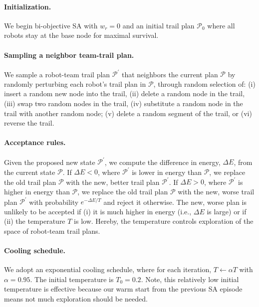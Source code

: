 \documentclass[fleqn,10pt,lineno]{wlpeerj}
\begin{document}
\paragraph{Initialization.} We begin bi-objective SA with $w_r=0$ and an initial trail plan $\mathcal{P}_0$ where all robots stay at the base node for maximal survival.

\paragraph{Sampling a neighbor team-trail plan.}
We sample a robot-team trail plan $\mathcal{P}^\prime$ that neighbors the current plan $\mathcal{P}$ by randomly perturbing each robot's trail plan in $\mathcal{P}$, through random selection of: (i) insert a random new node into the trail, (ii) delete a random node in the trail, (iii) swap two random nodes in the trail, (iv) substitute a random node in the trail with another random node; (v) delete a random segment of the trail, or (vi) reverse the trail. 

\paragraph{Acceptance rules.}
Given the proposed new state $\mathcal{P}^\prime$, 
we compute the difference in energy, $\Delta E$, from the current state $\mathcal{P}$.
If $\Delta E < 0$, where $\mathcal{P}^\prime$ is lower in energy than $\mathcal{P}$, we replace the old trail plan $\mathcal{P}$ with the new, better trail plan $\mathcal{P}^\prime$. 
If $\Delta E > 0$, where $\mathcal{P}^\prime$ is higher in energy than $\mathcal{P}$, we replace the old trail plan $\mathcal{P}$ with the new, worse trail plan $\mathcal{P}^\prime$ with probability $e^{-\Delta E / T}$ and reject it otherwise. The new, worse plan is unlikely to be accepted if (i) it is much higher in energy (i.e., $\Delta E$ is large) or if (ii) the temperature $T$ is low. Hereby, the temperature controls exploration of the space of robot-team trail plans. 


\paragraph{Cooling schedule.}
We adopt an exponential cooling schedule, where for each iteration, $T \leftarrow \alpha T$ with $\alpha=0.95$. The initial temperature is $T_0=0.2$. Note, this relatively low initial temperature is effective because our warm start from the previous SA episode means not much exploration should be needed.
\end{document}
